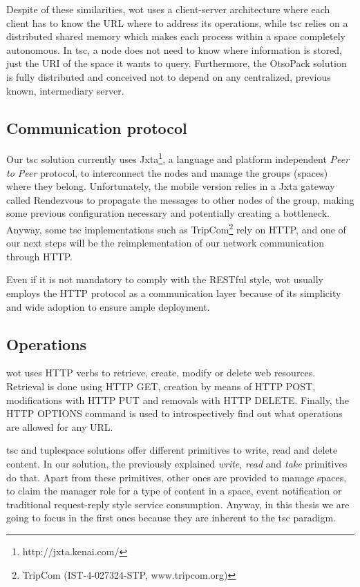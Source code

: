 Despite of these similarities, \ac{wot} uses a client-server architecture where each client has to know the URL where to address its operations, while
\ac{tsc} relies on a distributed shared memory which makes each process within a space completely autonomous. In \ac{tsc}, a node does not need to know where
information is stored, just the URI of the space it wants to query. Furthermore, the OtsoPack solution is fully distributed and conceived not to depend
on any centralized, previous known, intermediary server.

\subsection{Communication protocol}
Our \ac{tsc} solution currently uses Jxta\footnote{http://jxta.kenai.com/}, a language and platform independent \textit{Peer to Peer} protocol, to
interconnect the nodes and manage the groups (spaces) where they belong. Unfortunately, the mobile version relies in a Jxta gateway called Rendezvous
to propagate the messages to other nodes of the group, making some previous configuration necessary and potentially creating a bottleneck. Anyway,
some \ac{tsc} implementations such as TripCom\footnote{TripCom (IST-4-027324-STP, www.tripcom.org)} rely on HTTP, and one of our next steps will be the
reimplementation of our network communication through HTTP.

Even if it is not mandatory to comply with the RESTful style, \ac{wot} usually employs the HTTP protocol as a communication layer because of its
simplicity and wide adoption to ensure ample deployment.

\subsection{Operations}
\ac{wot} uses HTTP verbs to retrieve, create, modify or delete web resources. Retrieval is done using HTTP GET, creation by means of HTTP POST,
modifications with HTTP PUT and removals with HTTP DELETE. Finally, the HTTP OPTIONS command is used to introspectively find out what operations are
allowed for any URL.

\ac{tsc} and tuplespace solutions offer different primitives to write, read and delete content. In our solution, the previously explained \textit{write},
\textit{read} and \textit{take} primitives do that. Apart from these primitives, other ones are provided to manage spaces, to claim the manager role
for a type of content in a space, event notification or traditional request-reply style service consumption. Anyway, in this thesis we are going to focus in the
first ones because they are inherent to the \ac{tsc} paradigm. %

